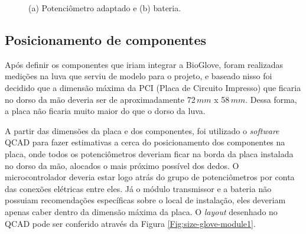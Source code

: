\documentclass[
	12pt,				%
	openright,			%
	oneside,			%
	a4paper,			%
	english,			%
	brazil				%
	]{abntex2}
\begin{document}
	\begin{figure}[!htb]
		 \centering
		 \caption{ (a) Potenciômetro adaptado e (b) bateria.}
		 \centering
		 \label{Fig:potentiometer-and-battery}
	 \end{figure}


			\subsection{Posicionamento de componentes}

			Após definir os componentes que iriam integrar a BioGlove, foram realizadas medições na luva que serviu de modelo para o projeto, e baseado nisso foi decidido que a dimensão máxima da PCI (Placa de Circuito Impresso) que ficaria no dorso da mão deveria ser de aproximadamente 72$\,mm$ x 58$\,mm$. Dessa forma, a placa não ficaria muito maior do que o dorso da luva. 
			
			A partir das dimensões da placa e dos componentes, foi utilizado o \textit{software} QCAD para fazer estimativas a cerca do posicionamento dos componentes na placa, onde todos os potenciômetros deveriam ficar na borda da placa instalada no dorso da mão, alocados o mais próximo possível dos dedos. O microcontrolador deveria estar logo atrás do grupo de potenciômetros por conta das conexões elétricas entre eles. Já o módulo transmissor e a bateria não possuiam recomendações específicas sobre o local de instalação, eles deveriam apenas caber dentro da dimensão máxima da placa. O \textit{layout} desenhado no QCAD pode ser conferido através da Figura \ref{Fig:size-glove-module1}.
\end{document}
